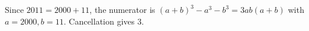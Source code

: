 Since $2011=2000+11$, the numerator is $(a+b)^3-a^3-b^3=3ab(a+b)$ with $a=2000,b=11$. Cancellation gives $\boxed3$.
